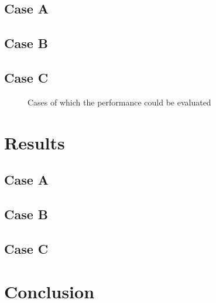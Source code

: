 \subsection{Case A}
\subsection{Case B}
\subsection{Case C}

\begin{figure}[h!]
	\centering
	\caption{Cases of which the performance could be evaluated \label{fig:routes}}
\end{figure}


\section{Results}
\subsection{Case A}
\subsection{Case B}
\subsection{Case C}


\section{Conclusion}

